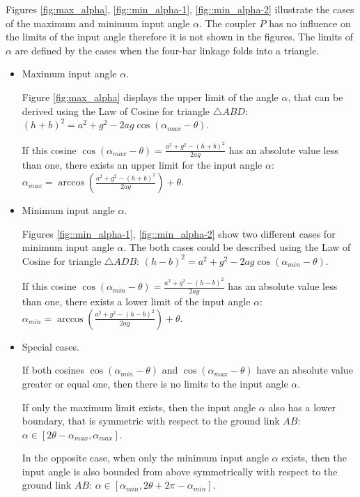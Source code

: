 \documentclass{article}
\begin{document}
 Figures \ref{fig:max_alpha}, \ref{fig::min_alpha-1}, \ref{fig::min_alpha-2} illustrate the cases of the maximum and minimum input angle $\alpha$. The coupler $P$ has no influence on the limits of the input angle therefore it is not shown in the figures. The limits of $\alpha$ are defined by the cases when the four-bar linkage folds into a triangle.
 
 \begin{itemize}
 \item Maximum input angle $\alpha$.
 
 Figure \ref{fig:max_alpha} displays the upper limit of the angle $\alpha$, that can be derived using the Law of Cosine for triangle $\triangle ABD$: $(h+b)^2 = a^2 + g^2 - 2 a g \cos(\alpha_{max}-\theta)$.
 
 If this cosine $\cos(\alpha_{max}-\theta) = \frac{a^2 + g^2 - (h+b)^2}{2 a g}$ has an absolute value less than one, there exists an upper limit for the input angle $\alpha$: $\alpha_{max} = \arccos(\frac{a^2 + g^2 - (h+b)^2}{2 a g}) + \theta$.
 
 \item Minimum input angle $\alpha$.
 
 Figures \ref{fig::min_alpha-1}, \ref{fig::min_alpha-2} show two different cases for minimum input angle $\alpha$. The both cases could be described using the Law of Cosine for triangle $\triangle ADB$: $(h-b)^2 = a^2 + g^2 - 2 a g \cos(\alpha_{min}-\theta)$.
 
 If this cosine $\cos(\alpha_{min}-\theta) = \frac{a^2 + g^2 - (h-b)^2}{2 a g}$ has an absolute value less than one, there exists a lower limit of the input angle $\alpha$: $\alpha_{min} = \arccos(\frac{a^2 + g^2 - (h-b)^2}{2 a g}) + \theta$.
 
 \item Special cases.
 
 If both cosines $\cos(\alpha_{min}-\theta)$ and $\cos(\alpha_{max}-\theta)$ have an absolute value greater or equal one, then there is no limits to the input angle $\alpha$.
 
 If only the maximum limit exists, then the input angle $\alpha$ also has a lower boundary, that is symmetric with respect to the ground link $AB$: $\alpha \in [2 \theta - \alpha_{max}, \alpha_{max}]$.
 
 In the opposite case, when only the minimum input angle $\alpha$ exists, then the input angle is also bounded from above symmetrically with respect to the ground link $AB$: $\alpha \in [\alpha_{min}, 2 \theta + 2 \pi - \alpha_{min}]$.
 \end{itemize}
 
\end{document}
